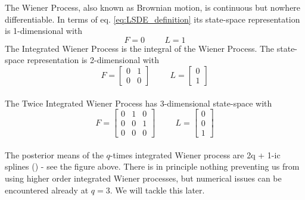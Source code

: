 {\begin{center}
        \label{fig:iwps}
    \end{center}
    The Wiener Process, also known as Brownian motion, is continuous but nowhere differentiable. In terms of eq. \ref{eq:LSDE_definition} its state-space representation is 1-dimensional with $$F=0  \hspace{1cm}L=1$$ 
    The Integrated Wiener Process is the integral of the Wiener Process. The state-space representation is 2-dimensional with $$F=\begin{bmatrix}
        0 & 1 \\ 0 & 0
    \end{bmatrix} \hspace{1cm} L=\begin{bmatrix}
        0 \\ 
        1 
    \end{bmatrix}$$
    \\ The Twice Integrated Wiener Process has 3-dimensional state-space with $$F=\begin{bmatrix}
        0 & 1 & 0 \\ 0 & 0 & 1 \\ 0 & 0 & 0
    \end{bmatrix} \hspace{1cm} L=\begin{bmatrix}
        0 \\ 0 \\ 1
    \end{bmatrix}$$
    \\ The posterior means of the $q$-times integrated Wiener process are 2q + 1-ic splines (\cite{probnum}) - see the figure above. There is in principle nothing preventing us from using higher order integrated Wiener processes, but numerical issues can be encountered already at $q=3$. We will tackle this later.
}
